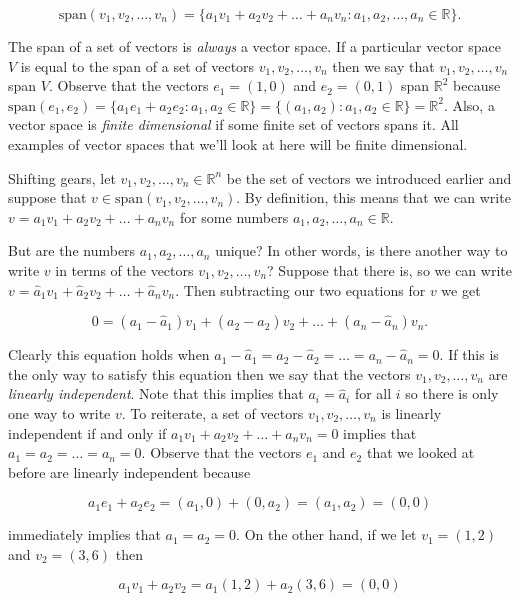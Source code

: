 \documentclass[12pt]{article}
\begin{document}
$$\textrm{span} (v_1, v_2, \ldots, v_n) = \{ a_1 v_1 + a_2 v_2 + \ldots + a_n v_n : a_1, a_2, \ldots, a_n \in \mathbb{R}\}.$$ 

The span of a set of vectors is \textit{always} a vector space. If a particular vector space $V$ is equal to the span of a set of vectors $v_1, v_2, \ldots, v_n$ then we say that $v_1, v_2, \ldots, v_n$ span $V$. Observe that the vectors $e_1 = (1, 0)$ and $e_2 = (0, 1)$ span $\mathbb{R}^2$ because $\textrm{span} (e_1, e_2) = \{a_1 e_1 + a_2 e_2 : a_1, a_2 \in \mathbb{R}\} = \{(a_1, a_2) : a_1, a_2 \in \mathbb{R}\} = \mathbb{R}^2$. Also, a vector space is \textit{finite dimensional} if some finite set of vectors spans it. All examples of vector spaces that we'll look at here will be finite dimensional.

Shifting gears, let $v_1, v_2, \ldots, v_n \in \mathbb{R}^n$ be the set of vectors we introduced earlier and suppose that $v \in \textrm{span}(v_1, v_2, \ldots, v_n)$. By definition, this means that we can write $v = a_1 v_1 + a_2 v_2 + \ldots + a_n v_n$ for some numbers $a_1, a_2, \ldots, a_n \in \mathbb{R}$. 

But are the numbers $a_1, a_2, \ldots, a_n$ unique? In other words, is there another way to write $v$ in terms of the vectors $v_1, v_2, \ldots, v_n$? Suppose that there is, so we can write $v = \hat{a}_1 v_1 + \hat{a}_2 v_2 + \ldots + \hat{a}_n v_n$. Then subtracting our two equations for $v$ we get

$$0 = (a_1 - \hat{a}_1) v_1 + (a_2 - \hat{a}_2) v_2 + \ldots + (a_n - \hat{a}_n) v_n.$$

Clearly this equation holds when $a_1 - \hat{a}_1 = a_2 - \hat{a}_2 = \ldots = a_n - \hat{a}_n = 0$. If this is the only way to satisfy this equation then we say that the vectors $v_1, v_2, \ldots, v_n$ are \textit{linearly independent}. Note that this implies that $a_i = \hat{a}_i$ for all $i$ so there is only one way to write $v$. To reiterate, a set of vectors $v_1, v_2, \ldots, v_n$ is linearly independent if and only if $a_1 v_1 + a_2 v_2 + \ldots + a_n v_n = 0$ implies that $a_1 = a_2 = \ldots = a_n = 0$. Observe that the vectors $e_1$ and $e_2$ that we looked at before are linearly independent because

$$a_1 e_1 + a_2 e_2 = (a_1, 0) + (0, a_2) = (a_1, a_2) = (0, 0)$$

immediately implies that $a_1 = a_2 = 0$. On the other hand, if we let $v_1 = (1, 2)$ and $v_2 = (3, 6)$ then

$$a_1 v_1 + a_2 v_2 = a_1 (1, 2) + a_2 (3, 6) = (0, 0)$$
\end{document}
